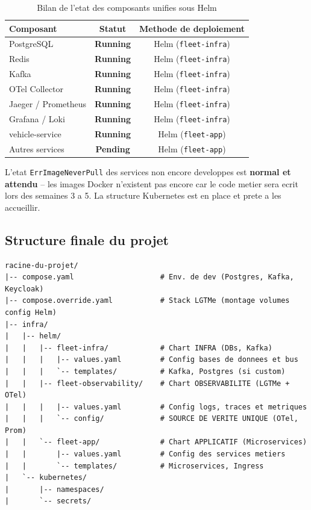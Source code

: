 \documentclass[12pt,a4paper]{article}
\begin{document}
\begin{table}[H]
  \centering
  \begin{tabular}{lcc}
    \toprule
    \textbf{Composant} & \textbf{Statut} & \textbf{Methode de deploiement} \\
    \midrule
    PostgreSQL           & \textcolor{success}{\textbf{Running}} & Helm (\texttt{fleet-infra}) \\
    Redis                & \textcolor{success}{\textbf{Running}} & Helm (\texttt{fleet-infra}) \\
    Kafka                & \textcolor{success}{\textbf{Running}} & Helm (\texttt{fleet-infra}) \\
    OTel Collector       & \textcolor{success}{\textbf{Running}} & Helm (\texttt{fleet-infra}) \\
    Jaeger / Prometheus  & \textcolor{success}{\textbf{Running}} & Helm (\texttt{fleet-infra}) \\
    Grafana / Loki       & \textcolor{success}{\textbf{Running}} & Helm (\texttt{fleet-infra}) \\
    vehicle-service      & \textcolor{success}{\textbf{Running}} & Helm (\texttt{fleet-app}) \\
    Autres services      & \textcolor{warning}{\textbf{Pending}} & Helm (\texttt{fleet-app}) \\
    \bottomrule
  \end{tabular}
  \caption{Bilan de l'etat des composants unifies sous Helm}
\end{table}

\begin{infobox}
L'etat \texttt{ErrImageNeverPull} des services non encore developpes est
\textbf{normal et attendu} -- les images Docker n'existent pas encore car le code
metier sera ecrit lors des semaines 3 a 5. La structure Kubernetes est en place et
prete a les accueillir.
\end{infobox}

\subsection{Structure finale du projet}

\begin{lstlisting}[caption=Arborescence des dossiers d'infrastructure]
racine-du-projet/
|-- compose.yaml                    # Env. de dev (Postgres, Kafka, Keycloak)
|-- compose.override.yaml           # Stack LGTMe (montage volumes config Helm)
|-- infra/
|   |-- helm/
|   |   |-- fleet-infra/            # Chart INFRA (DBs, Kafka)
|   |   |   |-- values.yaml         # Config bases de donnees et bus
|   |   |   `-- templates/          # Kafka, Postgres (si custom)
|   |   |-- fleet-observability/    # Chart OBSERVABILITE (LGTMe + OTel)
|   |   |   |-- values.yaml         # Config logs, traces et metriques
|   |   |   `-- config/             # SOURCE DE VERITE UNIQUE (OTel, Prom)
|   |   `-- fleet-app/              # Chart APPLICATIF (Microservices)
|   |       |-- values.yaml         # Config des services metiers
|   |       `-- templates/          # Microservices, Ingress
|   `-- kubernetes/
|       |-- namespaces/
|       `-- secrets/
\end{lstlisting}
\end{document}
